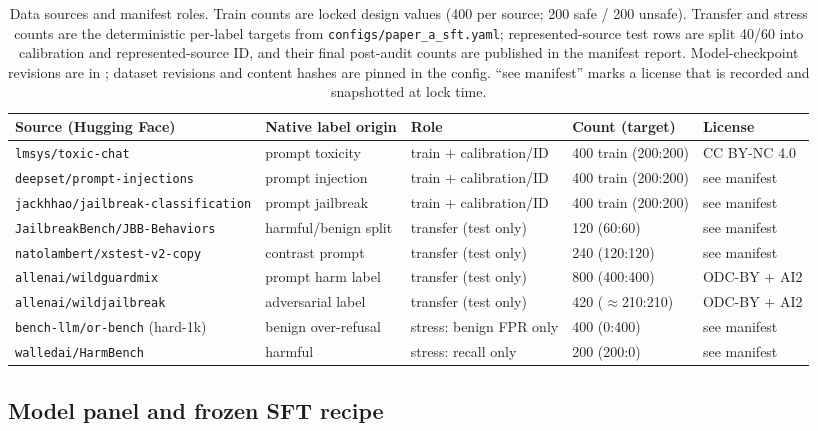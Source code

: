 \documentclass[sigconf,nonacm]{acmart}
\begin{document}
\begin{table}[t]
\centering
\small
\caption{Data sources and manifest roles. Train counts are locked design values (400 per source; 200 safe / 200 unsafe). Transfer and stress counts are the deterministic per-label targets from \texttt{configs/paper\_a\_sft.yaml}; represented-source test rows are split 40/60 into calibration and represented-source ID, and their final post-audit counts are published in the manifest report. Model-checkpoint revisions are in ; dataset revisions and content hashes are pinned in the config. ``see manifest'' marks a license that is recorded and snapshotted at lock time.}
\label{tab:data-roles}
\begin{tabular}{lllll}
\toprule
Source (Hugging Face) & Native label origin & Role & Count (target) & License \\
\midrule
\texttt{lmsys/toxic-chat} & prompt toxicity & train $+$ calibration/ID & 400 train (200:200) & CC BY-NC 4.0 \\
\texttt{deepset/prompt-injections} & prompt injection & train $+$ calibration/ID & 400 train (200:200) & see manifest \\
\texttt{jackhhao/jailbreak-classification} & prompt jailbreak & train $+$ calibration/ID & 400 train (200:200) & see manifest \\
\midrule
\texttt{JailbreakBench/JBB-Behaviors} & harmful/benign split & transfer (test only) & 120 (60:60) & see manifest \\
\texttt{natolambert/xstest-v2-copy} & contrast prompt & transfer (test only) & 240 (120:120) & see manifest \\
\texttt{allenai/wildguardmix} & prompt harm label & transfer (test only) & 800 (400:400) & ODC-BY $+$ AI2 \\
\texttt{allenai/wildjailbreak} & adversarial label & transfer (test only) & 420 ($\approx$210:210) & ODC-BY $+$ AI2 \\
\midrule
\texttt{bench-llm/or-bench} (hard-1k) & benign over-refusal & stress: benign FPR only & 400 (0:400) & see manifest \\
\texttt{walledai/HarmBench} & harmful & stress: recall only & 200 (200:0) & see manifest \\
\bottomrule
\end{tabular}
\end{table}

\subsection{Model panel and frozen SFT recipe}
\label{subsec:panel}
\end{document}
